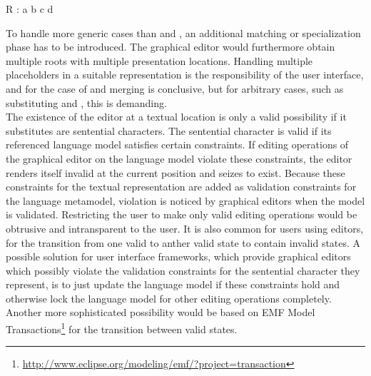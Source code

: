 \begin{xtxt}
R : a b c d
\end{xtxt}
To handle more generic cases than  and , an additional matching or specialization phase has to be introduced. The graphical editor would furthermore obtain multiple roots with multiple presentation locations. Handling multiple placeholders in a suitable representation is the responsibility of the user interface, and for the case of  and  merging is conclusive, but for arbitrary cases, such as substituting  and , this is demanding.\\
The existence of the editor at a textual location is only a valid possibility if it substitutes are sentential characters. The sentential character is valid if its referenced language model satisfies certain constraints. If editing operations of the graphical editor on the language model violate these constraints, the editor renders itself invalid at the current position and seizes to exist. Because these constraints for the textual representation are added as validation constraints for the language metamodel, violation is noticed by graphical editors when the model is validated. Restricting the user to make only valid editing operations would be obtrusive and intransparent to the user. It is also common for users using editors, for the transition from one valid to anther valid state to contain invalid states. A possible solution for user interface frameworks, which provide graphical editors which possibly violate the validation constraints for the sentential character they represent, is to just update the language model if these constraints hold and otherwise lock the language model for other editing operations completely. Another more sophisticated possibility would be based on EMF Model Transactions\footnote{\raggedright \url{http://www.eclipse.org/modeling/emf/?project=transaction}} for the transition between valid states.\\
